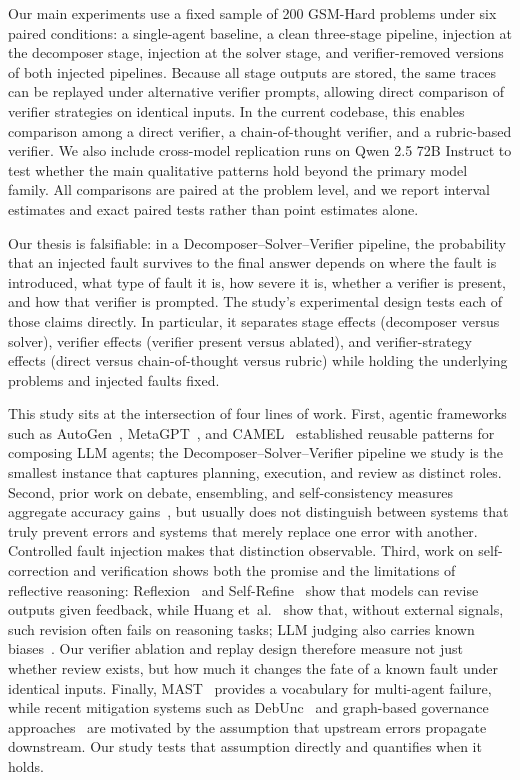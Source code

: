 \documentclass{article}
\begin{document}
Our main experiments use a fixed sample of 200 GSM-Hard problems under six
paired conditions: a single-agent baseline, a clean three-stage pipeline,
injection at the decomposer stage, injection at the solver stage, and
verifier-removed versions of both injected pipelines. Because all stage
outputs are stored, the same traces can be replayed under alternative verifier
prompts, allowing direct comparison of verifier strategies on identical
inputs. In the current codebase, this enables comparison among a direct
verifier, a chain-of-thought verifier, and a rubric-based verifier. We also
include cross-model replication runs on Qwen 2.5 72B Instruct to test whether
the main qualitative patterns hold beyond the primary model family. All
comparisons are paired at the problem level, and we report interval estimates
and exact paired tests rather than point estimates alone.

Our thesis is falsifiable: in a Decomposer--Solver--Verifier pipeline, the
probability that an injected fault survives to the final answer depends on
where the fault is introduced, what type of fault it is, how severe it is,
whether a verifier is present, and how that verifier is prompted. The study's
experimental design tests each of those claims directly. In particular, it
separates stage effects (decomposer versus solver), verifier effects
(verifier present versus ablated), and verifier-strategy effects (direct
versus chain-of-thought versus rubric) while holding the underlying problems
and injected faults fixed.

This study sits at the intersection of four lines of work. First, agentic
frameworks such as AutoGen~\citep{wu2023autogen}, MetaGPT~\citep{hong2023metagpt},
and CAMEL~\citep{li2023camel} established reusable patterns for composing LLM
agents; the Decomposer--Solver--Verifier pipeline we study is the smallest
instance that captures planning, execution, and review as distinct roles.
Second, prior work on debate, ensembling, and self-consistency measures
aggregate accuracy gains~\citep{du2023debate,li2024moreagents,wang2022selfconsistency},
but usually does not distinguish between systems that truly prevent errors and
systems that merely replace one error with another. Controlled fault injection
makes that distinction observable. Third, work on self-correction and
verification shows both the promise and the limitations of reflective
reasoning: Reflexion~\citep{shinn2023reflexion} and
Self-Refine~\citep{madaan2023selfrefine} show that models can revise outputs
given feedback, while Huang et~al.~\citep{huang2023selfcorrect} show that,
without external signals, such revision often fails on reasoning tasks; LLM
judging also carries known biases~\citep{zheng2023judge}. Our verifier
ablation and replay design therefore measure not just whether review exists,
but how much it changes the fate of a known fault under identical inputs.
Finally, MAST~\citep{cemri2025mast} provides a vocabulary for multi-agent
failure, while recent mitigation systems such as DebUnc~\citep{yoffe2024debunc}
and graph-based governance approaches~\citep{xie2026spark} are motivated by
the assumption that upstream errors propagate downstream. Our study tests that
assumption directly and quantifies when it holds.
\end{document}
